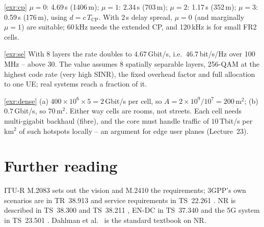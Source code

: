 \documentclass[11pt,a4paper]{article}
\begin{document}
\begin{solutionbox}{\ref{exr:cp}}
$\mu = 0$: 4.69\,\textmu s (1406\,m); $\mu = 1$: 2.34\,\textmu s (703\,m); $\mu = 2$: 1.17\,\textmu s (352\,m); $\mu = 3$: 0.59\,\textmu s
(176\,m), using $d = c\,T_{\mathrm{CP}}$. With 2\,\textmu s delay spread, $\mu = 0$ (and marginally $\mu = 1$) are suitable;
60\,kHz needs the extended CP, and 120\,kHz is for small FR2 cells.
\end{solutionbox}

\begin{solutionbox}{\ref{exr:se}}
With 8 layers the rate doubles to $4.67$\,Gbit/s, i.e.\ $46.7$\,bit/s/Hz over 100\,MHz -- above 30. The value assumes
8 spatially separable layers, 256-QAM at the highest code rate (very high SINR), the fixed overhead factor and full
allocation to one UE; real systems reach a fraction of it.
\end{solutionbox}

\begin{solutionbox}{\ref{exr:dense}}
(a) $400\times10^6\times5 = 2$\,Gbit/s per cell, so $A = 2\times10^9/10^7 = 200$\,m$^2$; (b) $0.7$\,Gbit/s, so 70\,m$^2$. Either way
cells are rooms, not streets. Each cell needs multi-gigabit backhaul (fibre), and the core must handle traffic of
$10$\,Tbit/s per km$^2$ of such hotspots locally -- an argument for edge user planes (Lecture~23).
\end{solutionbox}

\section{Further reading}
ITU-R M.2083 \cite{itu2015m2083} sets out the vision and M.2410 \cite{itu2017m2410} the requirements; 3GPP's own scenarios
are in TR~38.913 \cite{tr38913} and service requirements in TS~22.261 \cite{ts22261}. NR is described in TS~38.300
\cite{ts38300} and TS~38.211 \cite{ts38211}, EN-DC in TS~37.340 \cite{ts37340} and the 5G system in TS~23.501
\cite{ts23501}. Dahlman et al.\ \cite{dahlman2020nr} is the standard textbook on NR.

\printbibliography[heading=subbibliography,title={\ACNstrRefs}]
\end{document}
